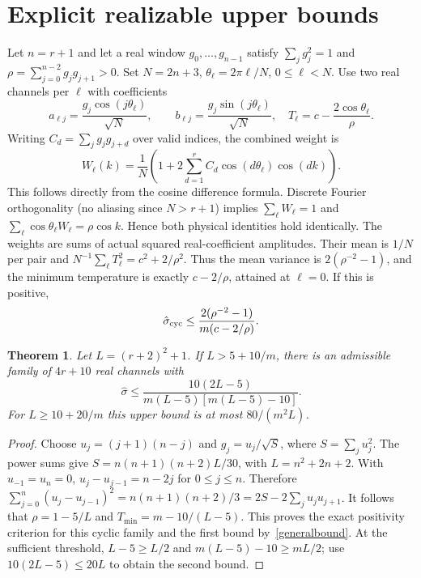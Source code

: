 \documentclass[11pt]{article}
\newtheorem{theorem}{Theorem}
\begin{document}
\section{Explicit realizable upper bounds}
Let $n=r+1$ and let a real window $g_0,\ldots,g_{n-1}$ satisfy $\sum_jg_j^2=1$ and $\rho=\sum_{j=0}^{n-2}g_jg_{j+1}>0$. Set $N=2n+3$, $\theta_\ell=2\pi\ell/N$, $0\le\ell<N$. Use two real channels per $\ell$ with coefficients
\begin{equation}
a_{\ell j}=\frac{g_j\cos(j\theta_\ell)}{\sqrt N},\qquad b_{\ell j}=\frac{g_j\sin(j\theta_\ell)}{\sqrt N},\quad
T_\ell=c-\frac{2\cos\theta_\ell}{\rho}.
\end{equation}
Writing $C_d=\sum_jg_jg_{j+d}$ over valid indices, the combined weight is
\begin{equation}
W_\ell(k)=\frac1N\left(1+2\sum_{d=1}^r C_d\cos(d\theta_\ell)\cos(dk)\right).
\end{equation}
This follows directly from the cosine difference formula. Discrete Fourier orthogonality (no aliasing since $N>r+1$) implies $\sum_\ell W_\ell=1$ and $\sum_\ell \cos\theta_\ell W_\ell=\rho\cos k$. Hence both physical identities hold identically. The weights are sums of actual squared real-coefficient amplitudes. Their mean is $1/N$ per pair and $N^{-1}\sum_\ell T_\ell^2=c^2+2/\rho^2$. Thus the mean variance is $2(\rho^{-2}-1)$, and the minimum temperature is exactly $c-2/\rho$, attained at $\ell=0$. If this is positive,
\begin{equation}\label{generalbound}
\hat\sigma_{\rm cyc}\le \frac{2(\rho^{-2}-1)}{m(c-2/\rho)}.
\end{equation}

\begin{theorem}\label{upper}
Let $L=(r+2)^2+1$. If $L>5+10/m$, there is an admissible family of $4r+10$ real channels with
\begin{equation}
\hat\sigma\le\frac{10(2L-5)}{m(L-5)[m(L-5)-10]}.
\end{equation}
For $L\ge10+20/m$ this upper bound is at most $80/(m^2L)$.
\end{theorem}
\begin{proof}
Choose $u_j=(j+1)(n-j)$ and $g_j=u_j/\sqrt S$, where $S=\sum_j u_j^2$. The power sums give $S=n(n+1)(n+2)L/30$, with $L=n^2+2n+2$. With $u_{-1}=u_n=0$, $u_j-u_{j-1}=n-2j$ for $0\le j\le n$. Therefore $\sum_{j=0}^n(u_j-u_{j-1})^2=n(n+1)(n+2)/3=2S-2\sum_j u_ju_{j+1}$. It follows that $\rho=1-5/L$ and $T_{\min}=m-10/(L-5)$. This proves the exact positivity criterion for this cyclic family and the first bound by~\eqref{generalbound}. At the sufficient threshold, $L-5\ge L/2$ and $m(L-5)-10\ge mL/2$; use $10(2L-5)\le20L$ to obtain the second bound.
\end{proof}
\end{document}
